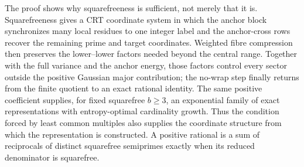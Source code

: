 The proof shows why squarefreeness is sufficient, not merely that it is.  Squarefreeness gives a CRT coordinate system in which the anchor block synchronizes many local residues to one integer label and the anchor-cross rows recover the remaining prime and target coordinates.  Weighted fibre compression then preserves the lower--lower factors needed beyond the central range.  Together with the full variance and the anchor energy, those factors control every sector outside the positive Gaussian major contribution; the no-wrap step finally returns from the finite quotient to an exact rational identity.  The same positive coefficient supplies, for fixed squarefree $b\geq3$, an exponential family of exact representations with entropy-optimal cardinality growth.  Thus the condition forced by least common multiples also supplies the coordinate structure from which the representation is constructed.  A positive rational is a sum of reciprocals of distinct squarefree semiprimes exactly when its reduced denominator is squarefree.
